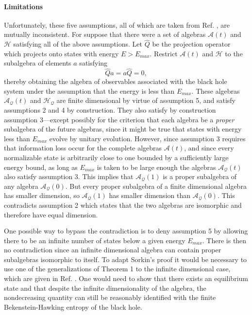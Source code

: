\documentclass{article}
\begin{document}
\paragraph{Limitations}

Unfortunately, these five assumptions, all of which are taken from Ref. \cite{sorkin86}, are mutually inconsistent.  For suppose that there were a set of algebras $\mathcal{A}(t)$ and $\mathcal{H}$ satisfying all of the above assumptions.  Let $\hat{Q}$ be the projection operator which projects onto states with energy $E > E_{max}$.  Restrict $\mathcal{A}(t)$ and $\mathcal{H}$ to the subalgebra of elements $a$ satisfying
\begin{equation}
\hat{Q}a = a\hat{Q} = 0,
\end{equation}
thereby obtaining the algebra of observables associated with the black hole system under the assumption that the energy is less than $E_{max}$.  These algebras $\mathcal{A_Q}(t)$ and $\mathcal{H_Q}$ are finite dimensional by virtue of assumption 5, and satisfy assumptions 2 and 4 by construction.  They also satisfy by construction assumption 3---except possibly for the criterion that each algebra be a \emph{proper} subalgebra of the future algebras, since it might be true that states with energy less than $E_{max}$ evolve by unitary evolution.  However, since assumption 3 requires that information loss occur for the complete algebras $\mathcal{A}(t)$, and since every normalizable state is arbitrarily close to one bounded by a sufficiently large energy bound, as long as $E_{max}$ is taken to be large enough the algebras $\mathcal{A_Q}(t)$ also satisfy assumption 3.  This implies that $\mathcal{A_Q}(1)$ is a proper subalgebra of any algebra $\mathcal{A_Q}(0)$.  But every proper subalgebra of a finite dimensional algebra has smaller dimension, so $\mathcal{A_Q}(1)$ has smaller dimension than $\mathcal{A_Q}(0)$.  This contradicts assumption 2 which states that the two algebras are isomorphic and therefore have equal dimension.

One possible way to bypass the contradiction is to deny assumption 5 by allowing there to be an infinite number of states below a given energy $E_{max}$.  There is then no contradiction since an infinite dimensional algebra can contain proper subalgebras isomorphic to itself.  To adapt Sorkin's proof it would be necessary to use one of the generalizations of Theorem 1 to the infinite dimensional case, which are given in Ref. \cite{lindblad75}.  One would need to show that there exists an equilibrium state and that despite the infinite dimensionality of the algebra, the nondecreasing quantity can still be reasonably identified with the finite Bekenstein-Hawking entropy of the black hole.
\end{document}
